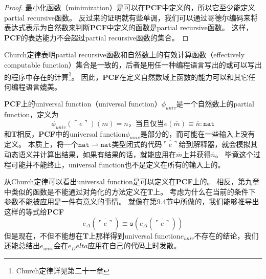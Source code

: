 \begin{proof}
	最小化函数（minimization）是可以在\textbf{PCF}中定义的，所以它至少能定义\gls{partial recursive}函数。
	反过来的证明就有些单调，我们可以通过哥德尔编码来将表达式表示为自然数来判断\textbf{PCF}中定义的函数是\gls{partial recursive}函数。
	这样，\textbf{PCF}的表达能力不会超过\gls{partial recursive}函数的集合。
\end{proof}

Church定律表明\gls{partial recursive}函数和自然数上的有效计算函数（effectively computable function）集合是一致的，后者是用任一种编程语言写出的或可以写出的程序中存在的计算\footnote{Church定律详见第二十一章}。
因此，\textbf{PCF}在定义自然数域上函数的能力可以和其它任何编程语言媲美。

\textbf{PCF}上的\gls{universal function}（universal function）\(\phi_{univ}\)是一个自然数上的\gls{partial function}，定义为
\[
	\phi_{univ}(\ulcorner  e \urcorner)(m) = n \text{，当且仅当} e(\overline{m}) \equiv \overline{n}: \mathtt{nat}
\]
和\textbf{T}相反，\textbf{PCF}中的\gls{universal function}\(\phi_{univ}\)是部分的，而可能在一些输入上没有定义。
本质上，将一个\(\mathtt{nat} \rightharpoonup \mathtt{nat}\)类型闭式的代码\(\overline{\ulcorner e \urcorner}\)给到解释器，就会模拟其动态语义并计算出结果，如果有结果的话，就能应用在\(\overline{m}\)上并获得\(\overline{n}\)。
毕竟这个过程可能并不能终止，\gls{universal function}也不是定义在所有的输入上的。

从Church定律可以看出\gls{universal function}是可以定义在\textbf{PCF}上的。
相反，第九章中类似的函数是不能通过对角化的方法定义在\textbf{T}上。
考虑为什么在当前的条件下参数不能被应用是一件有意义的事情。
就像在第9.4节中所做的，我们能够推导出这样的等式给\textbf{PCF}
\[
	e_\Delta(\overline{\ulcorner e \urcorner}) \equiv \mathtt{s}(e_\Delta(\overline{\ulcorner e \urcorner}))
\]
但是现在，不但不能想在\textbf{T}上那样得到\gls{universal function}\(e_{univ}\)不存在的结论，我们还能总结出\(e_{univ}\)会在\(e_Delta\)应用在自己的代码上时发散。
